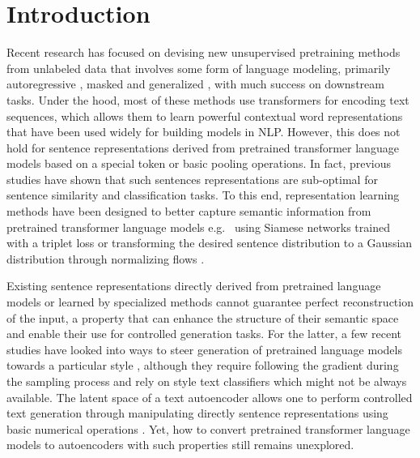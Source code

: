 


\section{Introduction} 


Recent research has focused on devising new unsupervised pretraining methods from unlabeled data that involves some form of language modeling, primarily autoregressive \citep{peters-etal-2018-deep,radford2019language}, masked \citep{devlin-etal-2019-bert, liu2019RoBERTa, conneau2020unsupervised} and generalized \citep{radford2019language, brown2020language,pmlr-v97-song19d}, with much success on downstream tasks.  Under the hood, most of these methods use transformers \citep{vaswani17} for encoding text sequences, which allows them to learn powerful contextual word representations that have been used widely for building models in NLP. However, this  does not hold for sentence representations derived from pretrained transformer language models based on a special token or basic pooling operations. In fact, previous studies have shown  that such sentences representations are sub-optimal for sentence similarity and  classification tasks. To this end, representation learning methods have been designed to better capture semantic information from pretrained transformer language models e.g.~ using Siamese networks trained with a triplet loss \cite{Reimers2019SentenceBERT} or transforming the desired sentence distribution to a Gaussian distribution through normalizing flows \cite{li-etal-2020-sentence}. 

Existing sentence representations directly derived from pretrained language models or learned by specialized methods cannot guarantee perfect reconstruction of the input, a property that can enhance the structure of their semantic space and enable their use for controlled generation tasks. For the latter, a few recent studies have looked into ways to steer generation of pretrained language models towards a particular style \citep{Dathathri2020Plug,krause2021gedi}, although they require following the gradient during the sampling process and rely on style text classifiers which might not be always available. The latent space of a text autoencoder allows one to perform controlled text generation through manipulating directly sentence representations using basic numerical operations \cite{pmlr-v119-shen20c}. Yet, how to convert pretrained transformer language models to autoencoders with such properties still remains unexplored. 

